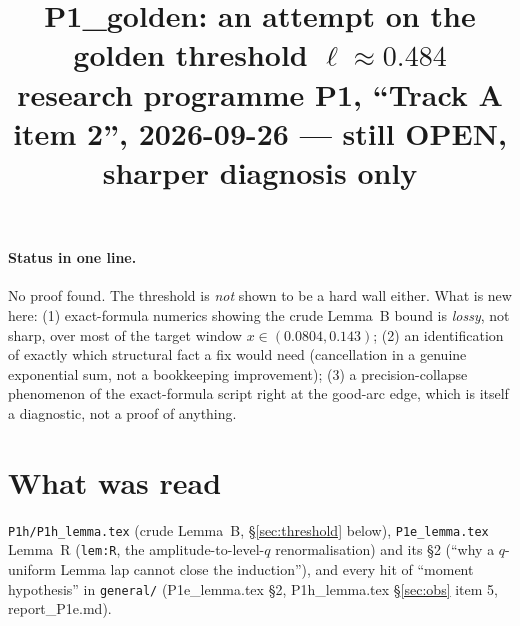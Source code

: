\documentclass[11pt]{article}
\title{P1\_golden: an attempt on the golden threshold $\ell\approx0.484$\\
\small research programme P1, ``Track A item 2'', 2026-09-26 --- still OPEN, sharper diagnosis only}
\date{}
\theoremstyle{remark}\newtheorem{remark}[theorem]{Remark}
\begin{document}
\maketitle

\paragraph{Status in one line.} No proof found. The threshold is \emph{not} shown to be a hard wall either. What is new here: (1) exact-formula numerics showing the crude Lemma~B bound is \emph{lossy}, not sharp, over most of the target window $x\in(0.0804,0.143)$; (2) an identification of exactly which structural fact a fix would need (cancellation in a genuine exponential sum, not a bookkeeping improvement); (3) a precision-collapse phenomenon of the exact-formula script right at the good-arc edge, which is itself a diagnostic, not a proof of anything.

\section{What was read}
\texttt{P1h/P1h\_lemma.tex} (crude Lemma~B, \S\ref{sec:threshold} below), \texttt{P1e\_lemma.tex} Lemma~R (\texttt{lem:R}, the amplitude-to-level-$q$ renormalisation) and its \S2 (``why a $q$-uniform Lemma lap cannot close the induction''), and every hit of ``moment hypothesis'' in \texttt{general/} (P1e\_lemma.tex \S2, P1h\_lemma.tex \S\ref{sec:obs} item 5, report\_P1e.md).
\end{document}
